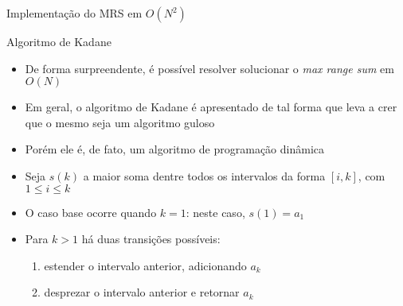 \begin{frame}[fragile]{Implementação do MRS em $O(N^2)$}
\end{frame}

\begin{frame}[fragile]{Algoritmo de Kadane}

    \begin{itemize}
        \item De forma surpreendente, é possível resolver solucionar o \textit{max range sum} em
            $O(N)$

        \item Em geral, o algoritmo de Kadane é apresentado de tal forma que leva a crer que o 
            mesmo seja um algoritmo guloso

        \item Porém ele é, de fato, um algoritmo de programação dinâmica

        \item Seja $s(k)$ a maior soma dentre todos os intervalos da forma $[i, k]$, com 
            $1\leq i\leq k$

        \item O caso base ocorre quando $k = 1$: neste caso, $s(1) = a_1$

        \item Para $k > 1$ há duas transições possíveis:
        \begin{enumerate}
            \item estender o intervalo anterior, adicionando $a_k$
            \item desprezar o intervalo anterior e retornar $a_k$
        \end{enumerate}
    \end{itemize}

\end{frame}

